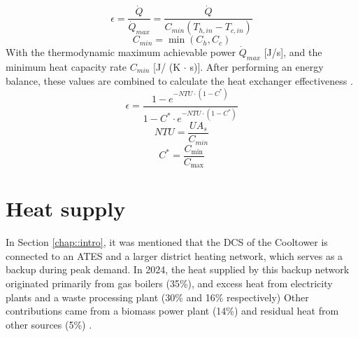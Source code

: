 \begin{equation}\label{eq::epsilon}
    \epsilon = \frac{\dot{Q}}{\dot{Q}_{max}} = \frac{\dot{Q}}{{C}_{min}(T_{h,in} - T_{c,in})}
\end{equation}
\begin{equation}
    C_{min} = \min(C_h, C_c)
\end{equation}
With the thermodynamic maximum achievable power $\dot{Q}_{max}$ [J/s], and the minimum heat capacity rate $C_{min}$ [J/ (K $\cdot$ s)]. After performing an energy balance, these values are combined to calculate the heat exchanger effectiveness \cite{cengel2025heat}.
\begin{equation}
    \epsilon = \frac{1 - e^{-NTU \cdot (1 - C^*)}}{1 - C^* \cdot e^{-NTU \cdot (1 - C^*)}}
\end{equation}
\begin{equation}
    NTU = \frac{U A_s}{C_{min}}
\end{equation}
\begin{equation}
    C^{*} = \frac{C_{\min}}{C_{\max}}
\end{equation}

\section{Heat supply}
In Section \ref{chap::intro}, it was mentioned that the DCS of the Cooltower is connected to an ATES and a larger district heating network, which serves as a backup during peak demand. In 2024, the heat supplied by this backup network originated primarily from gas boilers (35\%), and excess heat from electricity plants and a waste processing plant (30\% and 16\% respectively) Other contributions came from a biomass power plant (14\%) and residual heat from other sources (5\%) \cite{heatsupply}. 

